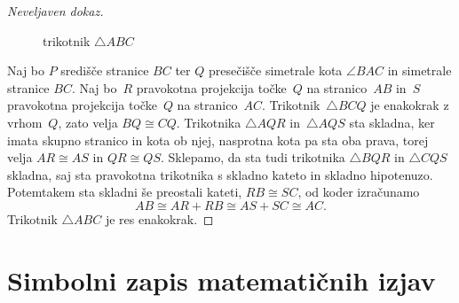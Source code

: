 \begin{proof}[Neveljaven dokaz]
\begin{figure}[ht]
\begin{center}
\end{center}
    \caption{trikotnik $\triangle ABC$}
    \label{fig:trikotnik}
  \end{figure}
  Naj bo $P$ središče stranice $BC$ ter $Q$ presečišče simetrale kota $\angle BAC$ in simetrale stranice $BC$.
  Naj bo~$R$ pravokotna projekcija točke~$Q$ na stranico~$AB$ in~$S$ pravokotna projekcija točke~$Q$ na stranico~$AC$.
  Trikotnik~$\triangle BCQ$ je enakokrak z vrhom~$Q$, zato velja $BQ \cong CQ$.
  Trikotnika $\triangle AQR$ in~$\triangle AQS$ sta skladna, ker imata skupno stranico in kota ob njej, nasprotna kota pa sta oba prava, torej velja $AR \cong AS$ in $QR \cong QS$.
  Sklepamo, da sta tudi trikotnika $\triangle BQR$ in $\triangle CQS$ skladna, saj sta pravokotna trikotnika s skladno kateto in skladno hipotenuzo. Potemtakem sta skladni še preostali kateti, $RB \cong SC$, od koder izračunamo
  \begin{equation*}
    AB \cong AR + RB \cong AS + SC \cong AC.
  \end{equation*}
  Trikotnik $\triangle ABC$ je res enakokrak.
\end{proof}



\section{Simbolni zapis matematičnih izjav}
\label{sec:simbolni-zapis-izjav}

